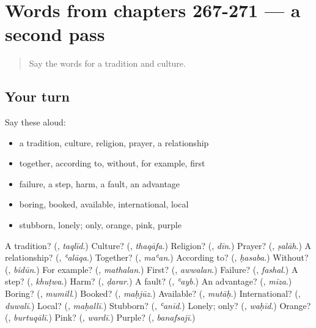 \section[(dialogue)]{Words from chapters 267-271 — a second pass}

\label{lesson:AR-R271-second-pass-words-from-chapters-267-271}



\begin{quote}
Say the words for a tradition and culture.
\end{quote}

\subsection*{Your turn}
Say these aloud:

\begin{itemize}
\raggedright
  \item a tradition, culture, religion, prayer, a relationship
  \item together, according to, without, for example, first
  \item failure, a step, harm, a fault, an advantage
  \item boring, booked, available, international, local
  \item stubborn, lonely; only, orange, pink, purple
\end{itemize}

\begin{tcolorbox}[breakable,colback=teal!4,colframe=teal!35!black,title={Before you move on}]
A tradition? (\textbf{}, \emph{taqlīd}.) Culture? (\textbf{}, \emph{thaqāfa}.) Religion? (\textbf{}, \emph{dīn}.) Prayer? (\textbf{}, \emph{ṣalāh}.) A relationship? (\textbf{}, \emph{ʿalāqa}.) Together? (\textbf{}, \emph{maʿan}.) According to? (\textbf{}, \emph{ḥasaba}.) Without? (\textbf{}, \emph{bidūn}.) For example? (\textbf{}, \emph{mathalan}.) First? (\textbf{}, \emph{awwalan}.) Failure? (\textbf{}, \emph{fashal}.) A step? (\textbf{}, \emph{khuṭwa}.) Harm? (\textbf{}, \emph{ḍarar}.) A fault? (\textbf{}, \emph{ʿayb}.) An advantage? (\textbf{}, \emph{mīza}.) Boring? (\textbf{}, \emph{mumill}.) Booked? (\textbf{}, \emph{maḥjūz}.) Available? (\textbf{}, \emph{mutāḥ}.) International? (\textbf{}, \emph{duwalī}.) Local? (\textbf{}, \emph{maḥallī}.) Stubborn? (\textbf{}, \emph{ʿanīd}.) Lonely; only? (\textbf{}, \emph{waḥīd}.) Orange? (\textbf{}, \emph{burtuqālī}.) Pink? (\textbf{}, \emph{wardī}.) Purple? (\textbf{}, \emph{banafsajī}.)
\end{tcolorbox}
